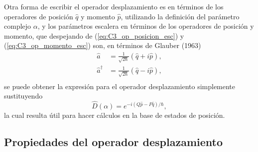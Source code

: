 Otra forma de escribir el operador desplazamiento es en términos de los operadores de posición $\hat{q}$ y momento $\hat{p}$, utilizando la definición del parámetro complejo $\alpha$, y los parámetros escalera en términos de los operadores de posición y momento, que despejando de (\ref{eq:C3_op_posicion_esc}) y (\ref{eq:C3_op_momento_esc}) son, en términos de Glauber (1963)
\begin{align}
  \hat{a}           & = \frac{1}{\sqrt{2\hbar}}(\hat{q} + i\hat{p}), \\
  \hat{a}^{\dagger} & = \frac{1}{\sqrt{2\hbar}}(\hat{q} - i\hat{p}), \\
\end{align}
se puede obtener la expresión para el operador desplazamiento simplemente sustituyendo
\begin{equation}
  \hat{D}(\alpha) = e^{-i(Q\hat{p}-P\hat{q})/\hbar},
\end{equation}
la cual resulta útil para hacer cálculos en la base de estados de posición.
\subsection{Propiedades del operador desplazamiento}

